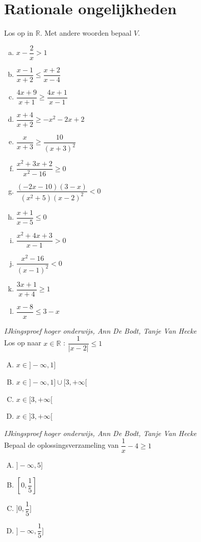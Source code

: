 \documentclass[a4paper,12pt]{article}
\begin{document}
\pagebreak
\section{Rationale ongelijkheden}

\begin{oefening}
Los op in $\mathbb{R}$. Met andere woorden bepaal $V$.
\begin{multicols}{2}
\begin{enumerate}[(a)]
  \itemsep.5em
  \item $x-\dfrac{2}{x}>1$
  \item $\dfrac{x-1}{x+2}\leq\dfrac{x+2}{x-4}$
  \item $\dfrac{4x+9}{x+1}\geq\dfrac{4x+1}{x-1}$
  \item $\dfrac{x+4}{x+2}\geq -x^2-2x+2$
  \item $\dfrac{x}{x+3}\geq\dfrac{10}{(x+3)^2}$
  \item $\dfrac{x^2+3x+2}{x^2-16}\geq0$
  \item $\dfrac{(-2x-10)(3-x)}{(x^2+5)(x-2)^2}<0$
  \item $\dfrac{x+1}{x-5}\leq 0$
  \item $\dfrac{x^2+4x+3}{x-1}>0$
  \item $\dfrac{x^2-16}{(x-1)^2}<0$
  \item $\dfrac{3x+1}{x+4}\geq 1$
  \item $\dfrac{x-8}{x}\leq 3-x$
\end{enumerate}
\end{multicols}
\end{oefening}

\begin{oefening}{\scriptsize\em IJkingsproef hoger onderwijs, Ann De Bodt, Tanje Van Hecke}\\
Los op naar $x\in\mathbb{R}$ : $\dfrac{1}{|x-2|}\leq 1$\\
\begin{enumerate}[(A)]
  \itemsep.5em
  \item $x\in]-\infty, 1]$
  \item $x\in]-\infty, 1]\cup[3,+\infty[$
  \item $x\in[3,+\infty[$
  \item $x\in]3,+\infty[$
\end{enumerate}
\end{oefening}

\begin{oefening}{\scriptsize\em IJkingsproef hoger onderwijs, Ann De Bodt, Tanje Van Hecke}\\
Bepaal de oplossingsverzameling van $\dfrac{1}{x} - 4 \geq 1$\\
\begin{enumerate}[(A)]
  \itemsep.5em
  \item $]-\infty, 5]$
  \item $[0, \dfrac{1}{5}]$
  \item $]0, \dfrac{1}{5}]$
  \item $]-\infty, \dfrac{1}{5}]$
\end{enumerate}
\end{oefening}
\end{document}
